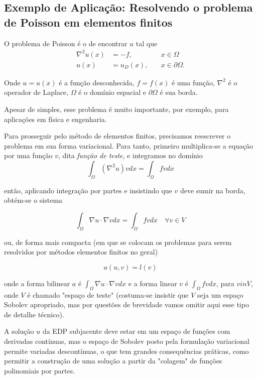 \documentclass[11pt]{article}
\begin{document}
    \subsection{Exemplo de Aplicação: Resolvendo o problema de Poisson em
elementos
finitos}\label{exemplo-de-aplicauxe7uxe3o-resolvendo-o-problema-de-poisson-em-elementos-finitos}

O problema de Poisson é o de encontrar \(u\) tal que
\[
\begin{aligned}
\nabla^2 u(x) &= -f,\quad & x \in \Omega \\
u(x) &= u_D(x),\quad &x \in \partial\Omega.
\end{aligned}
\]

Onde \(u = u(x)\) é a função desconhecida, \(f = f(x)\) é uma função,
\(\nabla^2\) é o operador de Laplace, \(\Omega\) é o domínio espacial e
\(\partial\Omega\) é sua borda.

Apesar de simples, esse problema é muito importante, por exemplo, para
aplicações em física e engenharia.

    Para prosseguir pelo método de elementos finitos, precisamos reescrever
o problema em sua forma variacional. Para tanto, primeiro multiplica-se
a equação por uma função \(v\), dita \emph{função de teste}, e
integramos no domínio \[
\int_{\Omega} (\nabla^2u)v dx = \int_{\Omega} fv dx
\]

então, aplicando integração por partes e insistindo que \(v\) deve sumir
na borda, obtém-se o sistema

\[
\int_{\Omega}\nabla u \cdot \nabla v dx = \int_{\Omega} fv dx \quad \forall v \in V
\]

ou, de forma mais compacta (em que se colocam os problemas para serem
resolvidos por métodos elementos finitos no geral)

\[
a(u,v) = l(v)
\]

onde a forma bilinear \(a\) é
\(\int_{\Omega}\nabla u \cdot \nabla v dx\) e a forma linear \(v\) é
\(\int_{\Omega} fv dx\), para \(v in V\), onde \(V\) é chamado "espaço
de teste" (costuma-se insistir que \(V\) seja um espaço Sobolev
apropriado, mas por questões de brevidade vamos omitir aqui esse tipo de
detalhe técnico).

A solução \(u\) da EDP subjacente deve estar em um espaço de funções com
derivadas contínuas, mas o espaço de Sobolev posto pela formulação
variacional permite variadas descontínuas, o que tem grandes
consequências práticas, como permitir a construção de uma solução a
partir da "colagem" de funções polinomiais por partes.
\end{document}
